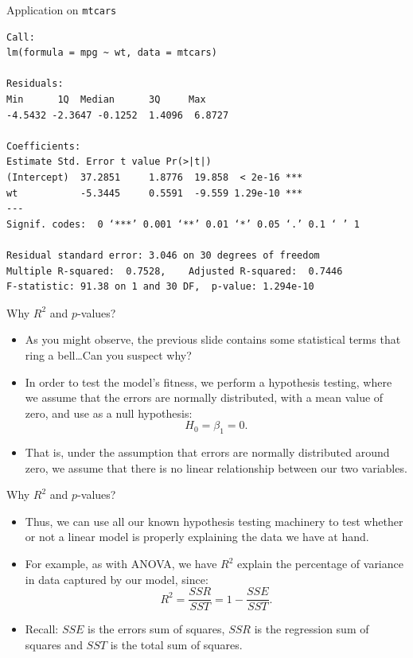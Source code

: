 \documentclass[aspectratio=169, 12pt, xcolor=table]{beamer}
\begin{document}
	\begin{frame}[fragile]{Application on \texttt{mtcars}}
		
		
		
		\begin{tiny}
\begin{verbatim}
Call:
lm(formula = mpg ~ wt, data = mtcars)

Residuals:
Min      1Q  Median      3Q     Max 
-4.5432 -2.3647 -0.1252  1.4096  6.8727 

Coefficients:
Estimate Std. Error t value Pr(>|t|)    
(Intercept)  37.2851     1.8776  19.858  < 2e-16 ***
wt           -5.3445     0.5591  -9.559 1.29e-10 ***
---
Signif. codes:  0 ‘***’ 0.001 ‘**’ 0.01 ‘*’ 0.05 ‘.’ 0.1 ‘ ’ 1

Residual standard error: 3.046 on 30 degrees of freedom
Multiple R-squared:  0.7528,    Adjusted R-squared:  0.7446 
F-statistic: 91.38 on 1 and 30 DF,  p-value: 1.294e-10
\end{verbatim}
		\end{tiny}
		
	\end{frame}


	\begin{frame}{Why $R^2$ and $p$-values?}
		\begin{itemize}
			\item As you might observe, the previous slide contains some statistical terms that ring a bell\ldots Can you suspect why?\pause
			\item In order to test the model's fitness, we perform a hypothesis testing, where we assume that the errors are normally distributed, with a mean value of zero, and use as a null hypothesis:
			\[H_0=\beta_1=0.\]
			\item That is, under the assumption that errors are normally distributed around zero, we assume that there is no linear relationship between our two variables.
		\end{itemize}
	\end{frame}

	
	\begin{frame}{Why $R^2$ and $p$-values?}
		\begin{itemize}
			\item Thus, we can use all our known hypothesis testing machinery to test whether or not a linear model is properly explaining the data we have at hand.
			\item For example, as with ANOVA, we have $R^2$ explain the percentage of variance in data captured by our model, since:
			\[R^2=\frac{SSR}{SST}=1-\frac{SSE}{SST}.\]
			\item Recall: $SSE$ is the errors sum of squares, $SSR$ is the regression sum of squares and $SST$ is the total sum of squares.
		\end{itemize}
	\end{frame}
\end{document}
